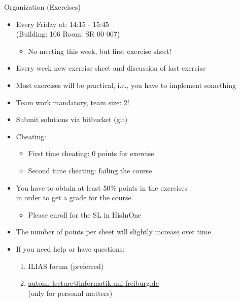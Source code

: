 \begin{frame}[c]{Organization (Exercises)}

\begin{itemize}
  \item Every Friday at: 14:15 - 15:45\\ (Building: 106 Room: SR 00 007)
  \begin{itemize}
    \item No meeting this week, but first exercise sheet!
  \end{itemize}
  \pause
  \item Every week new exercise sheet and discussion of last exercise
  \item Most exercises will be practical, i.e., you have to implement something
  \item Team work mandatory, team size: 2! 
  \item Submit solutions via bitbucket (git)
  \pause
  \item Cheating:
  \begin{itemize}
    \item First time cheating: $0$ points for exercise
    \item Second time cheating: failing the course
  \end{itemize}
  \pause
  \item You have to obtain at least $50\%$ points in the exercises \\
         in order to get a grade for the course
  \begin{itemize}
	  \item Please enroll for the SL in HisInOne
  \end{itemize}
  \pause
  \item The number of points per sheet will slightly increase over time
  \item If you need help or have questions:
  \begin{enumerate}
  	\item ILIAS forum (preferred)
  	\item \url{automl-lecture@informatik.uni-freiburg.de}\\ (only for personal matters)
  \end{enumerate}

\end{itemize}

\end{frame}
